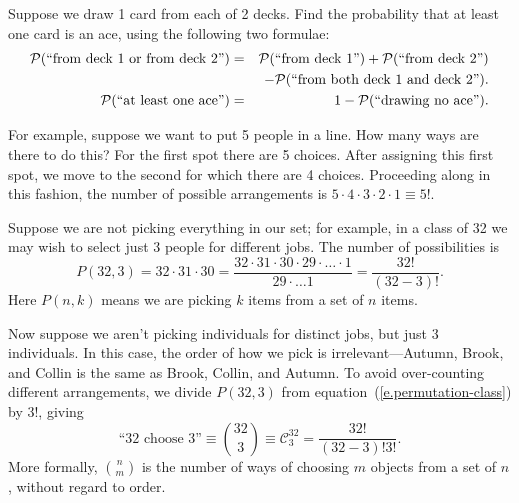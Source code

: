 \begin{exercisebox}
Suppose we draw 1 card from each of 2 decks.  Find the probability that at least one card is an ace, using the following two formulae:
\begin{eqnarray*}
\mathcal{P}(\textrm{``from deck 1 or from deck 2''}) &=& \mathcal{P}(\textrm{``from deck 1''})+	\mathcal{P}(\textrm{``from deck 2''}) \\
&& - \mathcal{P}(\textrm{``from both deck 1 and deck 2''}).\\
\mathcal{P}(\textrm{``at least one ace''}) &=& 1-\mathcal{P}(\textrm{``drawing no ace''}).
\end{eqnarray*}
\end{exercisebox}
 
 For example, suppose we want to put 5 people in a line. How many ways are there to do this?  For the first spot there are 5 choices.  After assigning this first spot, we move to the second for which there are 4 choices.  Proceeding along in this fashion, the number of possible arrangements is $5\cdot4\cdot3\cdot2\cdot1 \equiv 5!$.

Suppose we are not picking everything in our set; for example, in a class of 32 we may wish to select just 3 people for different jobs. The number of possibilities is
\begin{equation}\label{e.permutation-class}
 P(32,3) = 32\cdot31\cdot30 = \frac{32\cdot31\cdot30\cdot29\cdot\ldots\cdot 1}{29\cdot\ldots 1} = \frac{32!}{(32-3)!}.
\end{equation}
Here $P(n,k)$ means we are picking $k$ items from a set of $n$ items.

Now suppose we aren't picking individuals for distinct jobs, but just 3 individuals. In this case, the order of how we pick is irrelevant---Autumn, Brook, and Collin is the same as Brook, Collin, and Autumn.  To avoid over-counting different arrangements, we divide $P(32,3)$ from equation~(\ref{e.permutation-class}) by $3!$, giving
\begin{equation}\label{e.combination-class}
\textrm{``32 choose 3''} \equiv {32\choose3} \equiv \mathcal{C}^{32}_{3} = \frac{32!}{(32-3)!3!}.
\end{equation}
More formally, ${n\choose m}$ is the number of ways of choosing $m$ objects from a set of $n$, without regard to order.

